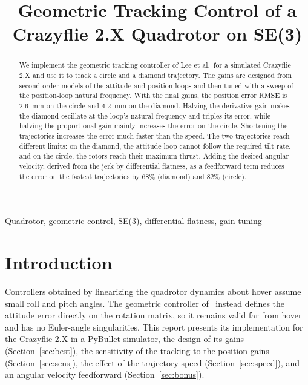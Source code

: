 \documentclass[conference]{IEEEtran}
\begin{document}
\title{Geometric Tracking Control of a Crazyflie 2.X Quadrotor on SE(3)}

\author{
}

\maketitle

\begin{abstract}
We implement the geometric tracking controller of Lee et al.\ for a simulated
Crazyflie 2.X and use it to track a circle and a diamond trajectory. The
gains are designed from second-order models of the attitude and position
loops and then tuned with a sweep of the position-loop natural frequency.
With the final gains, the position error RMSE is 2.6~mm on the circle and
4.2~mm on the diamond. Halving the derivative gain makes the diamond
oscillate at the loop's natural frequency and triples its error, while
halving the proportional gain mainly increases the error on the circle.
Shortening the trajectories increases the error much faster than the speed.
The two trajectories reach different limits: on the diamond, the attitude
loop cannot follow the required tilt rate, and on the circle, the rotors
reach their maximum thrust. Adding the desired angular velocity, derived
from the jerk by differential flatness, as a feedforward term reduces the
error on the fastest trajectories by 68\% (diamond) and 82\% (circle).
\end{abstract}

\begin{IEEEkeywords}
Quadrotor, geometric control, SE(3), differential flatness, gain tuning
\end{IEEEkeywords}

\section{Introduction}
Controllers obtained by linearizing the quadrotor dynamics about hover assume
small roll and pitch angles. The geometric controller of~\cite{lee} instead
defines the attitude error directly on the rotation matrix, so it remains
valid far from hover and has no Euler-angle singularities. This report
presents its implementation for the Crazyflie 2.X in a PyBullet simulator,
the design of its gains (Section~\ref{sec:best}), the sensitivity of the
tracking to the position gains (Section~\ref{sec:sens}), the effect of
the trajectory speed (Section~\ref{sec:speed}), and an angular velocity
feedforward (Section~\ref{sec:bonus}).
\end{document}
